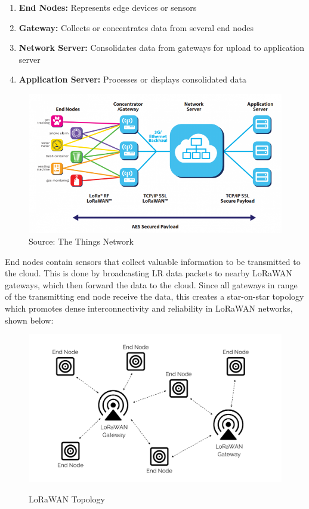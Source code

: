 \begin{enumerate}
	\item \textbf{End Nodes:} Represents edge devices or sensors
	\item \textbf{Gateway:} Collects or concentrates data from several end nodes
	\item \textbf{Network Server:} Consolidates data from gateways for upload to application server
	\item \textbf{Application Server:} Processes or displays consolidated data \cite{SeeedP2PLoRa2021}
\end{enumerate}

\begin{figure}
	\begin{center}
		\includegraphics[width=0.7\linewidth]{Images/LORA/TTN1.png}
		\caption{Source: The Things Network}
		\label{TTN1} 
	\end{center}
\end{figure}

End nodes contain sensors that collect valuable information to be transmitted to the cloud. This is done by broadcasting LR data packets to nearby LoRaWAN gateways, which then forward the data to the cloud. Since all gateways in range of the transmitting end node receive the data, this creates a star-on-star topology which promotes dense interconnectivity and reliability in LoRaWAN networks, shown below: 

\begin{figure}
	\begin{center}
		\includegraphics[width=0.7\linewidth]{Images/LORA/LoRaWAN Topology.png}
		\caption{LoRaWAN Topology}
		\label{LoRaWAN Topology} \cite{SeeedP2PLoRa2021}
	\end{center}
\end{figure}

